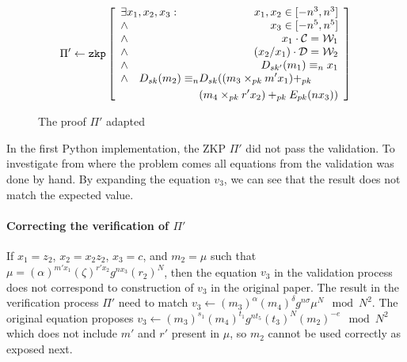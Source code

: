 \begin{figure}[h]
    \begin{table}[H]
      \centering
      \begin{footnotesize}
        \[
        \Pi' \leftarrow \texttt{zkp} \begin{bmatrix}\begin{array}{lr}
                                          \exists x_1, x_2, x_3 : & x_1, x_2 \in [-n^3, n^3] \\
                                          \land & x_3 \in [-n^5, n^5] \\
                                          \land & x_1 \cdot \mathcal{C} = \mathcal{W}_1 \\
                                          \land & (x_2/x_1) \cdot \mathcal{D} = \mathcal{W}_2 \\
                                          \land & D_{sk'}(m_1) \equiv_n x_1 \\
                                          \multicolumn{2}{l}{
                                            \begin{aligned}[t]
                                                \land \quad D_{sk}(m_2) \equiv_n & D_{sk}((m_3 \times_{pk} m'x_1) +_{pk} \\
                                                                                 & (m_4 \times_{pk} r'x_2) +_{pk} E_{pk}(nx_3))
                                              \end{aligned}
                                          }
                                         \end{array}\end{bmatrix}
        \]
      \end{footnotesize}
    \end{table}

  \caption{The proof $\Pi'$ adapted}
  \label{fig:theProofPi2}
\end{figure}

In the first Python implementation, the ZKP $\Pi'$ did not pass the validation.
To investigate from where the problem comes all equations from the validation
was done by hand. By expanding the equation $v_3$, we can see that the result
does not match the expected value.

\paragraph{Correcting the verification of $\Pi'$}
If $x_1 = z_2$, $x_2 = x_2 z_2$, $x_3 = c$, and $m_2 = \mu$ such that $\mu =
(\alpha)^{m' x_1} (\zeta)^{r' x_2} g^{nx_3} (r_2)^{N}$, then the equation $v_3$
in the validation process does not correspond to construction of $v_3$ in the
original paper. The result in the verification process $\Pi'$ need to match
$v_3 \leftarrow (m_3)^{\alpha} (m_4)^{\delta} g^{n \sigma} \mu^{N} \mod N^2$.
The original equation proposes $v_3 \leftarrow (m_3)^{s_1} (m_4)^{t_1} g^{nt_5}
(t_3)^{N} (m_2)^{-e} \mod N^2$ which does not include $m'$ and $r'$ present in $\mu$,
so $m_2$ cannot be used correctly as exposed next.

